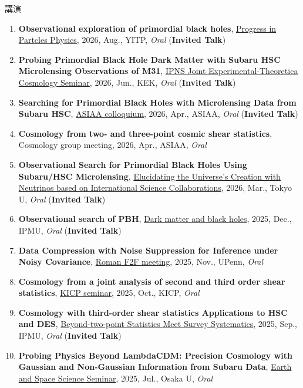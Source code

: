\begin{rSection}{講演}
\begin{enumerate}[itemsep=0pt, parsep=0pt, topsep=0pt, partopsep=0pt]
\item \textbf{Observational exploration of primordial black holes}, \href{https://indico.yukawa.kyoto-u.ac.jp/event/95/overview}{Progress in Partcles Physics}, 2026, Aug., YITP, \textit{Oral} (\textbf{Invited Talk})
\item \textbf{Probing Primordial Black Hole Dark Matter with Subaru HSC Microlensing Observations of M31}, \href{https://cosmophysics.gitlab.io/jointseminar.gitlab.io/sugiyama20260615.html}{IPNS Joint Experimental-Theoretica Cosmology Seminar}, 2026, Jun., KEK, \textit{Oral} (\textbf{Invited Talk})
\item \textbf{Searching for Primordial Black Holes with Microlensing Data from Subaru HSC}, \href{https://www.asiaa.sinica.edu.tw/activity/colloquium.php}{ASIAA colloquium}, 2026, Apr., ASIAA, \textit{Oral} (\textbf{Invited Talk})
\item \textbf{Cosmology from two- and three-point cosmic shear statistics}, Cosmology group meeting, 2026, Apr., ASIAA, \textit{Oral}
\item \textbf{Observational Search for Primordial Black Holes Using Subaru/HSC Microlensing}, \href{https://www-kam2.icrr.u-tokyo.ac.jp/event/19/}{Elucidating the Universe's Creation with Neutrinos based on International Science Collaborations}, 2026, Mar., Tokyo U, \textit{Oral} (\textbf{Invited Talk})
\item \textbf{Observational search of PBH}, \href{https://indico.ipmu.jp/event/464/timetable/#20251205}{Dark matter and black holes}, 2025, Dec., IPMU, \textit{Oral} (\textbf{Invited Talk})
\item \textbf{Data Compression with Noise Suppression 
for Inference under Noisy Covariance}, \href{https://roman-hlis-cosmology.caltech.edu/news/2024-f2f}{Roman F2F meeting}, 2025, Nov., UPenn, \textit{Oral}
\item \textbf{Cosmology from a joint analysis of second and third order shear statistics}, \href{https://astrophysics.uchicago.edu/events/event/2530/?past=y}{KICP seminar}, 2025, Oct., KICP, \textit{Oral}
\item \textbf{Cosmology with third-order shear statistics Applications to HSC and DES}, \href{https://indico.ipmu.jp/event/460/overview}{Beyond-two-point Statistics Meet Survey Systematics}, 2025, Sep., IPMU, \textit{Oral} (\textbf{Invited Talk})
\item \textbf{Probing Physics Beyond LambdaCDM: Precision Cosmology with Gaussian and Non-Gaussian Information from Subaru Data}, \href{https://www.ess.sci.osaka-u.ac.jp/researchers/seminar.html}{Earth and Space Science Seminar}, 2025, Jul., Osaka U, \textit{Oral}

\end{enumerate}
\end{rSection}

